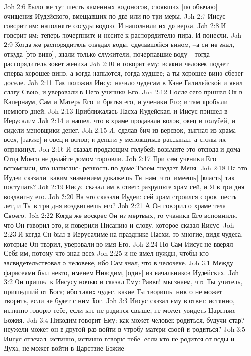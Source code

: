 Joh 2:6  Было же тут шесть каменных водоносов, стоявших [по обычаю] очищения Иудейского, вмещавших по две или по три меры.
Joh 2:7  Иисус говорит им: наполните сосуды водою. И наполнили их до верха.
Joh 2:8  И говорит им: теперь почерпните и несите к распорядителю пира. И понесли.
Joh 2:9  Когда же распорядитель отведал воды, сделавшейся вином, --а он не знал, откуда [это вино], знали только служители, почерпавшие воду, --тогда распорядитель зовет жениха
Joh 2:10  и говорит ему: всякий человек подает сперва хорошее вино, а когда напьются, тогда худшее; а ты хорошее вино сберег доселе.
Joh 2:11  Так положил Иисус начало чудесам в Кане Галилейской и явил славу Свою; и уверовали в Него ученики Его.
Joh 2:12  После сего пришел Он в Капернаум, Сам и Матерь Его, и братья его, и ученики Его; и там пробыли немного дней.
Joh 2:13  Приближалась Пасха Иудейская, и Иисус пришел в Иерусалим
Joh 2:14  и нашел, что в храме продавали волов, овец и голубей, и сидели меновщики денег.
Joh 2:15  И, сделав бич из веревок, выгнал из храма всех, [также] и овец и волов; и деньги у меновщиков рассыпал, а столы их опрокинул.
Joh 2:16  И сказал продающим голубей: возьмите это отсюда и дома Отца Моего не делайте домом торговли.
Joh 2:17  При сем ученики Его вспомнили, что написано: ревность по доме Твоем снедает Меня.
Joh 2:18  На это Иудеи сказали: каким знамением докажешь Ты нам, что [имеешь] [власть] так поступать?
Joh 2:19  Иисус сказал им в ответ: разрушьте храм сей, и Я в три дня воздвигну его.
Joh 2:20  На это сказали Иудеи: сей храм строился сорок шесть лет, и Ты в три дня воздвигнешь его?
Joh 2:21  А Он говорил о храме тела Своего.
Joh 2:22  Когда же воскрес Он из мертвых, то ученики Его вспомнили, что Он говорил это, и поверили Писанию и слову, которое сказал Иисус.
Joh 2:23  И когда Он был в Иерусалиме на празднике Пасхи, то многие, видя чудеса, которые Он творил, уверовали во имя Его.
Joh 2:24  Но Сам Иисус не вверял Себя им, потому что знал всех
Joh 2:25  и не имел нужды, чтобы кто засвидетельствовал о человеке, ибо Сам знал, что в человеке.
Joh 3:1  Между фарисеями был некто, именем Никодим, [один] из начальников Иудейских.
Joh 3:2  Он пришел к Иисусу ночью и сказал Ему: Равви! мы знаем, что Ты учитель, пришедший от Бога; ибо таких чудес, какие Ты творишь, никто не может творить, если не будет с ним Бог.
Joh 3:3  Иисус сказал ему в ответ: истинно, истинно говорю тебе, если кто не родится свыше, не может увидеть Царствия Божия.
Joh 3:4  Никодим говорит Ему: как может человек родиться, будучи стар? неужели может он в другой раз войти в утробу матери своей и родиться?
Joh 3:5  Иисус отвечал: истинно, истинно говорю тебе, если кто не родится от воды и Духа, не может войти в Царствие Божие.
